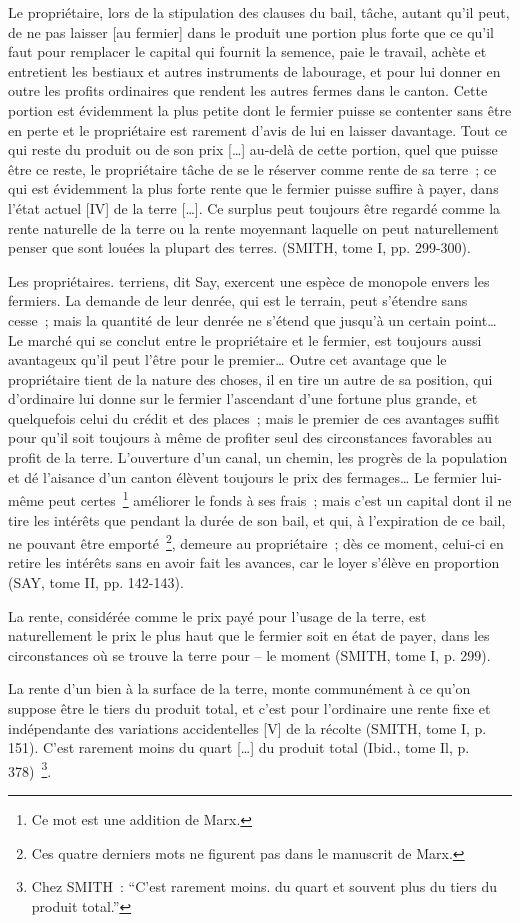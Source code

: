 \documentclass[french,twoside]{book} %
\newenvironment{quoteblock}%
  {\begin{quoting}}
  {\end{quoting}}
\newenvironment{quotebar}{%
    \def\FrameCommand{{\color{rubric!10!}\vrule width 0.5em} \hspace{0.9em}}%
    \def\OuterFrameSep{\itemsep} %
    \MakeFramed {\advance\hsize-\width \FrameRestore}
  }%
  {%
    \endMakeFramed
  }
\renewenvironment{quoteblock}%
  {%
    \savenotes
    \setstretch{0.9}
    \normalfont
    \begin{quotebar}
  }
  {%
    \end{quotebar}
    \spewnotes
  }
\begin{document}
\begin{quoteblock}
 \noindent Le propriétaire, lors de la stipulation des clauses du bail, tâche, autant qu’il peut, de ne pas laisser [au fermier] dans le produit une portion plus forte que ce qu’il faut pour remplacer le capital qui fournit la semence, paie le travail, achète et entretient les bestiaux et autres instruments de labourage, et pour lui donner en outre les profits ordinaires que rendent les autres fermes dans le canton. Cette portion est évidemment la plus petite dont le fermier puisse se contenter sans être en perte et le propriétaire est rarement d’avis de lui en laisser davantage. Tout ce qui reste du produit ou de son prix […] au-delà de cette portion, quel que puisse être ce reste, le propriétaire tâche de se le réserver comme rente de sa terre ; ce qui est évidemment la plus forte rente que le fermier puisse suffire à payer, dans l’état actuel [IV] de la terre […]. Ce surplus peut toujours être regardé comme la rente naturelle de la terre ou la rente moyennant laquelle on peut naturellement penser que sont louées la plupart des terres. (SMITH, tome I, pp. 299-300).\par
 Les propriétaires. terriens, dit Say, exercent une espèce de monopole envers les fermiers. La demande de leur denrée, qui est le terrain, peut s’étendre sans cesse ; mais la quantité de leur denrée ne s’étend que jusqu’à un certain point… Le marché qui se conclut entre le propriétaire et le fermier, est toujours aussi avantageux qu’il peut l’être pour le premier… Outre cet avantage que le propriétaire tient de la nature des choses, il en tire un autre de sa position, qui d’ordinaire lui donne sur le fermier l’ascendant d’une fortune plus grande, et quelquefois celui du crédit et des places ; mais le premier de ces avantages suffit pour qu’il soit toujours à même de profiter seul des circonstances favorables au profit de la terre. L’ouverture d’un canal, un chemin, les progrès de la population et dé l’aisance d’un canton élèvent toujours le prix des fermages… Le fermier lui-même peut certes \footnote{Ce mot est une addition de Marx.} améliorer le fonds à ses frais ; mais c’est un capital dont il ne tire les intérêts que pendant la durée de son bail, et qui, à l’expiration de ce bail, ne pouvant être emporté \footnote{Ces quatre derniers mots ne figurent pas dans le manuscrit de Marx.}, demeure au propriétaire ; dès ce moment, celui-ci en retire les intérêts sans en avoir fait les avances, car le loyer s’élève en proportion (SAY, tome II, pp. 142-143).\par
 La rente, considérée comme le prix payé pour l’usage de la terre, est naturellement le prix le plus haut que le fermier soit en état de payer, dans les circonstances où se trouve la terre pour – le moment (SMITH, tome I, p. 299).\par
 La rente d’un bien à la surface de la terre, monte communément à ce qu’on suppose être le tiers du produit total, et c’est pour l’ordinaire une rente fixe et indépendante des variations accidentelles [V] de la récolte (SMITH, tome I, p. 151). C’est rarement moins du quart […] du produit total (Ibid., tome Il, p. 378) \footnote{Chez SMITH : “C’est rarement moins. du quart et souvent plus du tiers du produit total.”}.
 \end{quoteblock}
\end{document}
